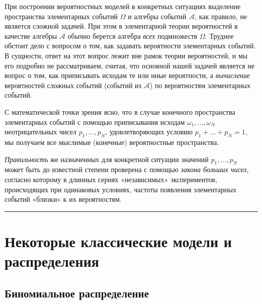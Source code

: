 \documentclass[11pt,a4paper]{article}
\begin{document}
При построении вероятностных моделей в конкретных ситуациях выделение
пространства элементарных событий \(\Omega\) и алгебры событий
\(\mathcal{A}\), как правило, не является сложной задачей. При этом в
элементарной теории вероятностей в качестве алгебры \(\mathcal{A}\)
обычно берется алгебра \emph{всех} подмножеств \(\Omega\). Труднее
обстоит дело с вопросом о том, как задавать вероятности элементарных
событий. В сущности, ответ на этот вопрос лежит вне рамок теории
вероятностей, и мы его подробно не рассматриваем, считая, что основной
нашей задачей является не вопрос о том, как приписывать исходам те или
иные вероятности, а \emph{вычисление} вероятностей сложных событий
(событий из \(\mathcal{A}\)) по вероятностям элементарных событий.

С математической точки зрения ясно, что в случае конечного пространства
элементарных событий с помощью приписывания исходам
\(\omega_1, \ldots , \omega_N\) неотрицательных чисел
\(p_1, \ldots , p_N\), удовлетворяющих условию
\(p_1 + \ldots + p_N = 1\), мы получаем все мыслимые (конечные)
вероятностные пространства.

\emph{Правильность} же назначенных для конкретной ситуации значений
\(p_1, \ldots , p_N\) может быть до известной степени проверена с
помощью \emph{закона больших чисел}, согласно которому в длинных сериях
«независимых» экспериментов, происходящих при одинаковых условиях,
частоты появления элементарных событий «близки» к их вероятностям.

    \begin{center}\rule{0.5\linewidth}{\linethickness}\end{center}

    \hypertarget{ux43dux435ux43aux43eux442ux43eux440ux44bux435-ux43aux43bux430ux441ux441ux438ux447ux435ux441ux43aux438ux435-ux43cux43eux434ux435ux43bux438-ux438-ux440ux430ux441ux43fux440ux435ux434ux435ux43bux435ux43dux438ux44f}{%
\section{Некоторые классические модели и
распределения}\label{ux43dux435ux43aux43eux442ux43eux440ux44bux435-ux43aux43bux430ux441ux441ux438ux447ux435ux441ux43aux438ux435-ux43cux43eux434ux435ux43bux438-ux438-ux440ux430ux441ux43fux440ux435ux434ux435ux43bux435ux43dux438ux44f}}

    \hypertarget{ux431ux438ux43dux43eux43cux438ux430ux43bux44cux43dux43eux435-ux440ux430ux441ux43fux440ux435ux434ux435ux43bux435ux43dux438ux435}{%
\subsection{Биномиальное
распределение}\label{ux431ux438ux43dux43eux43cux438ux430ux43bux44cux43dux43eux435-ux440ux430ux441ux43fux440ux435ux434ux435ux43bux435ux43dux438ux435}}
\end{document}
